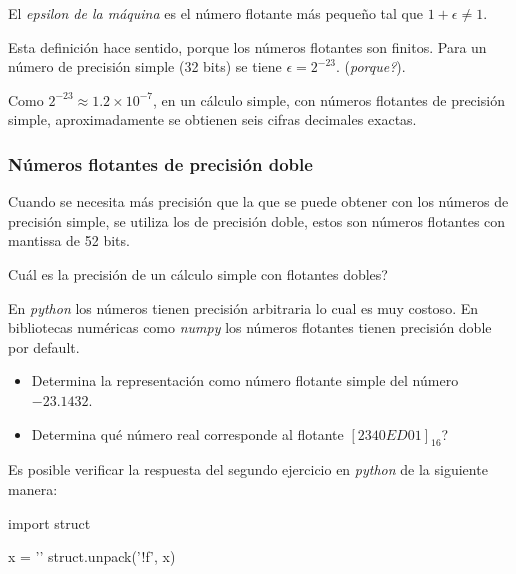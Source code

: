 \documentclass[spanish]{amsart}
\begin{document}
\begin{definition}
  El \emph{epsilon de la máquina} es el número flotante más pequeño tal que $1 + \epsilon \neq 1$.
\end{definition}

Esta definición hace sentido, porque los números flotantes son finitos. Para un número de precisión simple (32 bits) se tiene $\epsilon = 2^{-23}$. (\emph{porque?}).

\begin{remark}
  Como $2^{-23} \approx 1.2 \times 10^{-7}$, en un cálculo simple, con números flotantes de precisión simple, aproximadamente se obtienen seis cifras decimales exactas.
\end{remark}

\subsubsection{Números flotantes de precisión doble}

Cuando se necesita más precisión que la que se puede obtener con los números de precisión simple, se utiliza los de precisión doble, estos son números flotantes con mantissa de 52 bits. 

\begin{exercise}
  Cuál es la precisión de un cálculo simple con flotantes dobles?
\end{exercise}

\begin{remark}
  En \emph{python} los números tienen precisión arbitraria lo cual es muy costoso. En bibliotecas numéricas como \emph{numpy} los números flotantes tienen precisión doble por default.
\end{remark}

\begin{exercise}
  \begin{itemize}
  \item Determina la representación como número flotante simple del número $-23.1432$.
  \item Determina qué número real corresponde al flotante $[2340ED01]_{16}$?
  \end{itemize}
\end{exercise}

\begin{remark}
  Es posible verificar la respuesta del segundo ejercicio en \emph{python} de la siguiente manera:
  \begin{pythoncode}
    import struct

    x = '\xED{}'
    struct.unpack('!f', x)
  \end{pythoncode}
\end{remark}

\nocite{*}
{}

\end{document}
